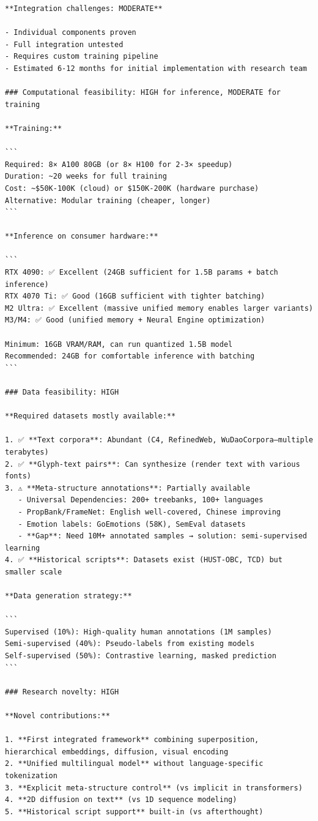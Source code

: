 \documentclass[11pt]{article}
\begin{document}
\begin{verbatim}
**Integration challenges: MODERATE**

- Individual components proven
- Full integration untested
- Requires custom training pipeline
- Estimated 6-12 months for initial implementation with research team

### Computational feasibility: HIGH for inference, MODERATE for training

**Training:**

```
Required: 8× A100 80GB (or 8× H100 for 2-3× speedup)
Duration: ~20 weeks for full training
Cost: ~$50K-100K (cloud) or $150K-200K (hardware purchase)
Alternative: Modular training (cheaper, longer)
```

**Inference on consumer hardware:**

```
RTX 4090: ✅ Excellent (24GB sufficient for 1.5B params + batch inference)
RTX 4070 Ti: ✅ Good (16GB sufficient with tighter batching)
M2 Ultra: ✅ Excellent (massive unified memory enables larger variants)
M3/M4: ✅ Good (unified memory + Neural Engine optimization)

Minimum: 16GB VRAM/RAM, can run quantized 1.5B model
Recommended: 24GB for comfortable inference with batching
```

### Data feasibility: HIGH

**Required datasets mostly available:**

1. ✅ **Text corpora**: Abundant (C4, RefinedWeb, WuDaoCorpora—multiple terabytes)
2. ✅ **Glyph-text pairs**: Can synthesize (render text with various fonts)
3. ⚠️ **Meta-structure annotations**: Partially available
   - Universal Dependencies: 200+ treebanks, 100+ languages
   - PropBank/FrameNet: English well-covered, Chinese improving
   - Emotion labels: GoEmotions (58K), SemEval datasets
   - **Gap**: Need 10M+ annotated samples → solution: semi-supervised learning
4. ✅ **Historical scripts**: Datasets exist (HUST-OBC, TCD) but smaller scale

**Data generation strategy:**

```
Supervised (10%): High-quality human annotations (1M samples)
Semi-supervised (40%): Pseudo-labels from existing models
Self-supervised (50%): Contrastive learning, masked prediction
```

### Research novelty: HIGH

**Novel contributions:**

1. **First integrated framework** combining superposition, hierarchical embeddings, diffusion, visual encoding
2. **Unified multilingual model** without language-specific tokenization
3. **Explicit meta-structure control** (vs implicit in transformers)
4. **2D diffusion on text** (vs 1D sequence modeling)
5. **Historical script support** built-in (vs afterthought)


\end{verbatim}
\end{document}
